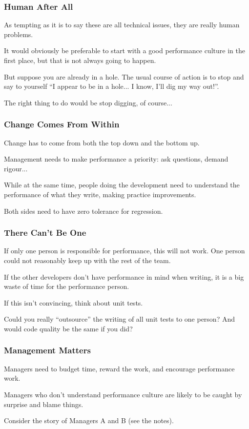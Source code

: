 \begin{frame}
\frametitle{Human After All}


As tempting as it is to say these are all technical issues, they are really human problems. 

It would obviously be preferable to start with a good performance culture in the first place, but that is not always going to happen. 

But suppose you are already in a hole. The usual course of action is to stop and say to yourself ``I appear to be in a hole... I know, I'll dig my way out!''. 

The right thing to do would be stop digging, of course...
\end{frame}



\begin{frame}
\frametitle{Change Comes From Within}

Change has to come from both the top down and the bottom up. 

Management needs to make performance a priority: ask questions, demand rigour... 

While at the same time, people doing the development need to understand the performance of what they write, making practice improvements. 

Both sides need to have zero tolerance for regression.

\end{frame}



\begin{frame}
\frametitle{There Can't Be One}

If only one person is responsible for performance, this will not work. One person could not reasonably keep up with the rest of the team. 

If the other developers don't have performance in mind when writing, it is a big waste of time for the performance person.

If this isn't convincing, think about unit tests. 

Could you really ``outsource'' the writing of all unit tests to one person? And would code quality be the same if you did?

\end{frame}



\begin{frame}
\frametitle{Management Matters}

Managers need to budget time, reward the work, and encourage performance work. 

Managers who don't understand performance culture are likely to be caught by surprise and blame things. 

Consider the story of Managers A and B (see the notes).

\end{frame}



